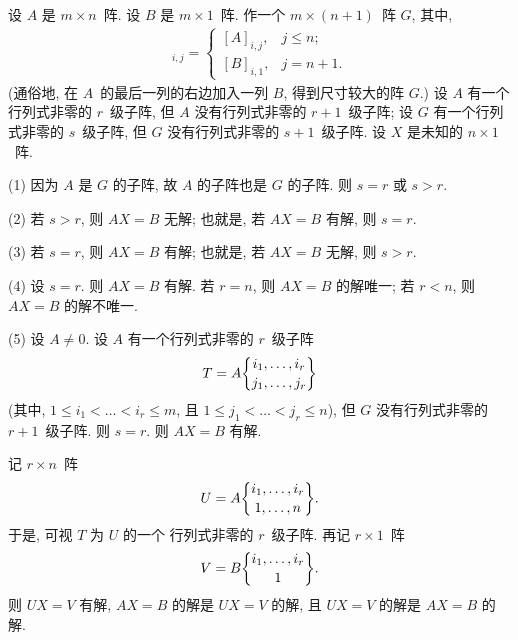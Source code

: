 \documentclass[../libro.tex]{subfiles}
\begin{document}
\begin{theorem}
    设 \(A\) 是 \(m \times n\)~阵.
    设 \(B\) 是 \(m \times 1\)~阵.
    作一个 \(m \times (n+1)\)~阵 \(G\),
    其中,
    \begin{align*}
        [G]_{i,j} =
        \begin{cases}
            [A]_{i,j}, & j \leq n;  \\
            [B]_{i,1}, & j = n + 1.
        \end{cases}
    \end{align*}
    (通俗地, 在 \(A\)~的最后一列的右边加入一列 \(B\),
    得到尺寸较大的阵 \(G\).)
    设 \(A\) 有一个行列式非零的 \(r\)~级子阵,
    但 \(A\) 没有行列式非零的 \(r+1\)~级子阵;
    设 \(G\) 有一个行列式非零的 \(s\)~级子阵,
    但 \(G\) 没有行列式非零的 \(s+1\)~级子阵.
    设 \(X\) 是未知的 \(n \times 1\)~阵.

    (1)
    因为 \(A\) 是 \(G\) 的子阵,
    故 \(A\) 的子阵也是 \(G\) 的子阵.
    则 \(s = r\) 或 \(s > r\).

    (2)
    若 \(s > r\), 则 \(AX = B\) 无解;
    也就是, 若 \(AX = B\) 有解, 则 \(s = r\).

    (3)
    若 \(s = r\), 则 \(AX = B\) 有解;
    也就是, 若 \(AX = B\) 无解, 则 \(s > r\).

    (4)
    设 \(s = r\).
    则 \(AX = B\) 有解.
    若 \(r = n\), 则 \(AX = B\) 的解唯一;
    若 \(r < n\), 则 \(AX = B\) 的解不唯一.

    (5)
    设 \(A \neq 0\).
    设 \(A\) 有一个行列式非零的 \(r\)~级子阵
    \begin{align*}
        T = A\submat{i_1,\dots,i_r}{j_1,\dots,j_r}
    \end{align*}
    (其中, \(1 \leq i_1 < \dots < i_r \leq m\),
    且 \(1 \leq j_1 < \dots < j_r \leq n\)),
    但 \(G\) 没有行列式非零的 \(r+1\)~级子阵.
    则 \(s = r\).
    则 \(AX = B\) 有解.

    记 \(r \times n\)~阵
    \begin{align*}
        U = A\submat{i_1,\dots,i_r}{1,\dots,n}.
    \end{align*}
    于是, 可视 \(T\) 为 \(U\) 的一个%
    行列式非零的 \(r\)~级子阵.
    再记 \(r \times 1\)~阵
    \begin{align*}
        V = B\submat{i_1,\dots,i_r}{1}
        .
    \end{align*}
    则 \(UX = V\) 有解,
    \(AX = B\) 的解是 \(UX = V\) 的解,
    且 \(UX = V\) 的解是 \(AX = B\) 的解.


\end{theorem}
\end{document}
